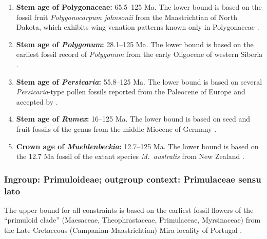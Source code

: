 \begin{enumerate}

\item \textbf{Stem age of Polygonaceae:} 65.5--125 Ma. The lower bound
  is based on the fossil fruit \textit{Polygonocarpum johnsonii} from
  the Maastrichtian of North Dakota, which exhibits wing venation
  patterns known only in Polygonaceae \citep{Manchester2010}.

\item \textbf{Stem age of \textit{Polygonum}:} 28.1--125 Ma. The
  lower bound is based on the earliest fossil record of
  \textit{Polygonum} from the early Oligocene of western Siberia
  \citep{Dorofeev1963}.

\item \textbf{Stem age of \textit{Persicaria}:} 55.8--125 Ma. The
  lower bound is based on several \textit{Persicaria}-type pollen
  fossils reported from the Paleocene of Europe
  \citep{Krutzsch1970,Gruas1978} and accepted by \citet{Muller1981}.

\item \textbf{Stem age of \textit{Rumex}:} 16--125 Ma. The lower
  bound is based on seed and fruit fossils of the genus from the
  middle Miocene of Germany \citep{Mai2001}.

\item \textbf{Crown age of \textit{Muehlenbeckia}:} 12.7--125 Ma. The
  lower bound is based on the 12.7 Ma fossil of the extant species
  \textit{M.~australis} from New Zealand
  \citep{Pole1993,Schuster2013}.

\end{enumerate}

\subsubsection*{Ingroup: Primuloideae; outgroup context: Primulaceae
  sensu lato}


The upper bound for all constraints is based on the earliest fossil
flowers of the ``primuloid clade'' (Maesaceae, Theophrastaceae,
Primulaceae, Myrsinaceae) from the Late Cretaceous
(Campanian-Maastrichtian) Mira locality of Portugal \citep{Friis2010}.


